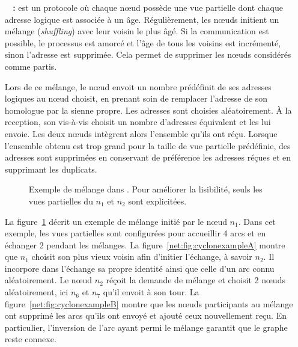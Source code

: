 \begin{itemize}
\item [\textbf{\CYCLON~\cite{voulgaris2005cyclon} :}] est un protocole où chaque
  nœud possède une vue partielle dont chaque adresse logique est associée à un
  âge. Régulièrement, les nœuds initient un mélange (\emph{shuffling}) avec leur
  voisin le plus âgé. Si la communication est possible, le processus est amorcé
  et l'âge de tous les voisins est incrémenté, sinon l'adresse est
  supprimée. Cela permet de supprimer les nœuds considérés comme partis.

  Lors de ce mélange, le nœud envoit un nombre prédéfinit de ses adresses
  logiques au nœud choisit, en prenant soin de remplacer l'adresse de son
  homologue par la sienne propre. Les adresses sont choisies aléatoirement. À la
  reception, son vis-à-vis choisit un nombre d'adresses équivalent et les lui
  envoie. Les deux nœuds intègrent alors l'ensemble qu'ils ont réçu. Lorsque
  l'ensemble obtenu est trop grand pour la taille de vue partielle prédéfinie,
  des adresses sont supprimées en conservant de préférence les adresses réçues
  et en supprimant les duplicats.
  
  \begin{figure}
    \centering
    \hspace{35pt}
    \caption{\label{net:fig:cyclonexample} Exemple de mélange dans \CYCLON. Pour
      améliorer la lisibilité, seuls les vues partielles du $n_1$ et $n_2$ sont
      explicitées.}
  \end{figure}
  
  La figure~\ref{net:fig:cyclonexample} décrit un exemple de mélange initié par
  le nœud $n_1$. Dans cet exemple, les vues partielles sont configurées pour
  accueillir 4 arcs et en échanger 2 pendant les mélanges. La
  figure~\ref{net:fig:cyclonexampleA} montre que $n_1$ choisit son plus vieux
  voisin afin d'initier l'échange, à savoir $n_2$. Il incorpore dans l'échange
  sa propre identité ainsi que celle d'un arc connu aléatoirement. Le nœud $n_2$
  réçoit la demande de mélange et choisit 2 nœuds aléatoirement, ici $n_6$ et
  $n_7$ qu'il envoit à son tour. La figure~\ref{net:fig:cyclonexampleB} montre
  que les nœuds participants au mélange ont supprimé les arcs qu'ils ont envoyé
  et ajouté ceux nouvellement reçu. En particulier, l'inversion de l'arc ayant
  permi le mélange garantit que le graphe reste connexe.


\end{itemize}
